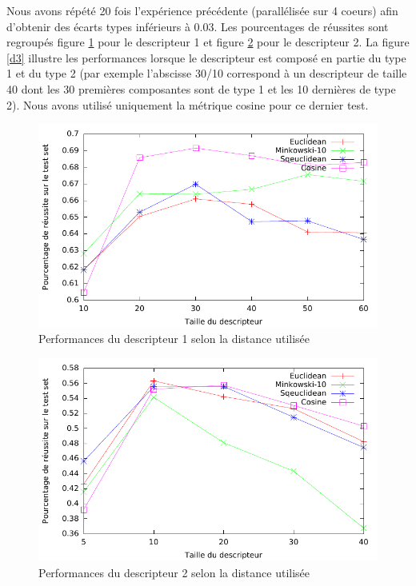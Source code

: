 \documentclass[a4paper,10pt]{article} %
\theoremstyle{definition} %
\begin{document}
Nous avons répété 20 fois l'expérience précédente (parallélisée sur 4 coeurs) afin d'obtenir des écarts types inférieurs à 0.03. Les pourcentages de réussites sont regroupés figure \ref{d1} pour le descripteur 1 et figure \ref{d2} pour le descripteur 2. La figure \ref{d3} illustre les performances lorsque le descripteur est composé en partie du type 1 et du type 2 (par exemple l'abscisse 30/10 correspond à un descripteur de taille 40 dont les 30 premières composantes sont de type 1 et les 10 dernières de type 2). Nous avons utilisé uniquement la métrique cosine pour ce dernier test.

\begin{figure}[H]
  \includegraphics[scale=1.15]{../plot/courbe1.pdf}
\caption{Performances du descripteur 1 selon la distance utilisée}
\label{d1}
\end{figure}

\begin{figure}[H]
  \includegraphics[scale=1.15]{../plot/courbe2.pdf}
\caption{Performances du descripteur 2 selon la distance utilisée}
\label{d2}
\end{figure}
\end{document}
